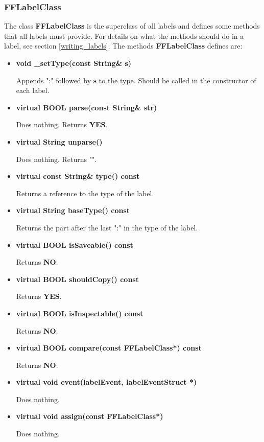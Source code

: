 \subsubsection{FFLabelClass}

The class {\bf FFLabelClass} is the superclass of all labels and
defines some methods that all labels must provide. For details on
what the methods should do in a label, see section
\vref{writing_labels}. The methods
{\bf FFLabelClass} defines are:

\begin{itemize}

\item{\bf void \_setType(const String\& s)}

Appends ":" followed by {\bf s} to the type. Should be called in
the constructor of each label.

\item{\bf virtual BOOL parse(const String\& str)}

Does nothing. Returns {\bf YES}.

\item{\bf virtual String unparse()}
  
Does nothing. Returns "".

\item{\bf virtual const String\& type() const}

Returns a reference to the type of the label.

\item{\bf virtual String baseType() const}

Returns the part after the last ":" in the type of the label.

\item{\bf virtual BOOL isSaveable() const}

Returns {\bf NO}. 

\item{\bf virtual BOOL shouldCopy() const}

Returns {\bf YES}.

\item{\bf virtual BOOL isInspectable() const}

Returns {\bf NO}.
  
\item{\bf virtual BOOL compare(const FFLabelClass*) const}

Returns {\bf NO}.

\item{\bf virtual void event(labelEvent, labelEventStruct *) }

Does nothing.

\item{\bf virtual void assign(const FFLabelClass*)}

Does nothing.

\end{itemize}

